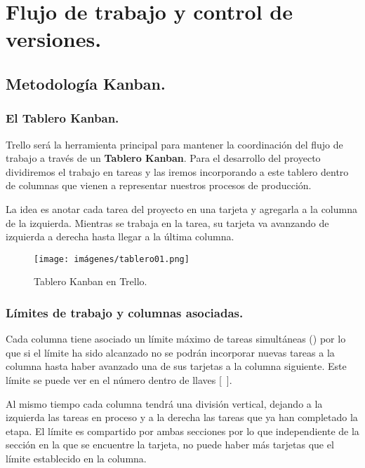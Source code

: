 
\section{Flujo de trabajo y control de versiones.}\label{flujo:flujo-de-trabajo}

\subsection{Metodología Kanban.}\label{flujo:metodologia-kanban}
\subsubsection{El Tablero Kanban.}\label{flujo:tablero-kanban}
Trello será la herramienta principal para mantener la coordinación del flujo de trabajo a través de un \textbf{Tablero Kanban}. Para el desarrollo del proyecto dividiremos el trabajo en tareas y las iremos incorporando a este tablero dentro de columnas que vienen a representar nuestros procesos de producción.

La idea es anotar cada tarea del proyecto en una tarjeta y agregarla a la columna de la izquierda. Mientras se trabaja en la tarea, su tarjeta va avanzando de izquierda a derecha hasta llegar a la última columna.  

\begin{figure}[h]
	\centering
	\texttt{[image: imágenes/tablero01.png]}
	\caption{Tablero Kanban en Trello.}
\end{figure}

\subsubsection{Límites de trabajo y columnas asociadas.}\label{flujo:limites-de-trabajo}
Cada columna tiene asociado un límite máximo de tareas simultáneas () por lo que si el límite ha sido alcanzado no se podrán incorporar nuevas tareas a la columna hasta haber avanzado una de sus tarjetas a la columna siguiente. Este límite se puede ver en el número dentro de llaves [~].

Al mismo tiempo cada columna tendrá una división vertical, dejando a la izquierda las tareas en proceso y a la derecha las tareas que ya han completado la etapa. El límite es compartido por ambas secciones por lo que independiente de la sección en la que se encuentre la tarjeta, no puede haber más tarjetas que el límite establecido en la columna.

